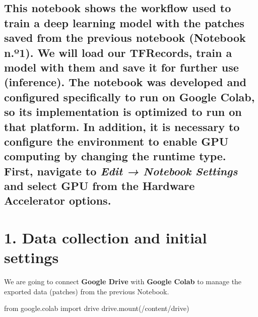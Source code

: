 \documentclass[
  letterpaper,
  DIV=11,
  numbers=noendperiod]{scrreprt}
\newenvironment{Shaded}{\begin{snugshade}}{\end{snugshade}}
\newcommand{\ImportTok}[1]{\textcolor[rgb]{0.00,0.46,0.62}{#1}}
\newcommand{\NormalTok}[1]{\textcolor[rgb]{0.00,0.23,0.31}{#1}}
\newcommand{\StringTok}[1]{\textcolor[rgb]{0.13,0.47,0.30}{#1}}
\begin{document}
\subsection{\texorpdfstring{This notebook shows the workflow used to
train a deep learning model with the patches saved from the previous
notebook (Notebook n.º1). We will load our TFRecords, train a model with
them and save it for further use (inference). The notebook was developed
and configured specifically to run on Google Colab, so its
implementation is optimized to run on that platform. In addition, it is
necessary to configure the environment to enable GPU computing by
changing the runtime type. First, navigate to \emph{Edit → Notebook
Settings} and select GPU from the Hardware Accelerator
options.}{This notebook shows the workflow used to train a deep learning model with the patches saved from the previous notebook (Notebook n.º1). We will load our TFRecords, train a model with them and save it for further use (inference). The notebook was developed and configured specifically to run on Google Colab, so its implementation is optimized to run on that platform. In addition, it is necessary to configure the environment to enable GPU computing by changing the runtime type. First, navigate to Edit → Notebook Settings and select GPU from the Hardware Accelerator options.}}\label{this-notebook-shows-the-workflow-used-to-train-a-deep-learning-model-with-the-patches-saved-from-the-previous-notebook-notebook-n.uxba1.-we-will-load-our-tfrecords-train-a-model-with-them-and-save-it-for-further-use-inference.-the-notebook-was-developed-and-configured-specifically-to-run-on-google-colab-so-its-implementation-is-optimized-to-run-on-that-platform.-in-addition-it-is-necessary-to-configure-the-environment-to-enable-gpu-computing-by-changing-the-runtime-type.-first-navigate-to-edit-notebook-settings-and-select-gpu-from-the-hardware-accelerator-options.}

\section{1. Data collection and initial
settings}\label{data-collection-and-initial-settings}

We are going to connect \textbf{Google Drive} with \textbf{Google Colab}
to manage the exported data (patches) from the previous Notebook.

\begin{Shaded}
\begin{Highlighting}[]
\ImportTok{from}\NormalTok{ google.colab }\ImportTok{import}\NormalTok{ drive}
\NormalTok{drive.mount(}\StringTok{\textquotesingle{}/content/drive\textquotesingle{}}\NormalTok{)}
\end{Highlighting}
\end{Shaded}
\end{document}

